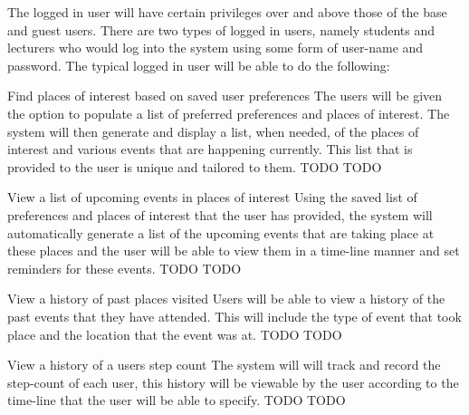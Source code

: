 The logged in user will have certain privileges over and above those of the base and guest users. There are two types of logged in users, namely students and lecturers who would log into the system using some form of user-name and password. The typical logged in user will be able to do the following:

\FuncReq
{Find places of interest based on saved user preferences}
{The users will be given the option to populate a list of preferred preferences and places of interest. The system will then generate and display a list, when needed, of the  places of interest and various events that are happening currently. This list that is provided to the user is unique and tailored to them.}
{TODO}
{TODO}


\FuncReq
{View a list of upcoming events in places of interest}
{Using the saved list of preferences and places of interest that the user has provided, the system will automatically generate a list of the upcoming events that are taking place at these places and the user will be able to view them in a time-line manner and set reminders for these events.}
{TODO}
{TODO}

\FuncReq
{View a history of past places visited}
{Users will be able to view a history of the past events that they have attended. This will include the type of event that took place and the location that the event was at.}
{TODO}
{TODO}

\FuncReq
{View a history of a users step count}
{The system will will track and record the step-count of each user, this history will be viewable by the user according to the time-line that the user will be able to specify.}
{TODO}
{TODO}
